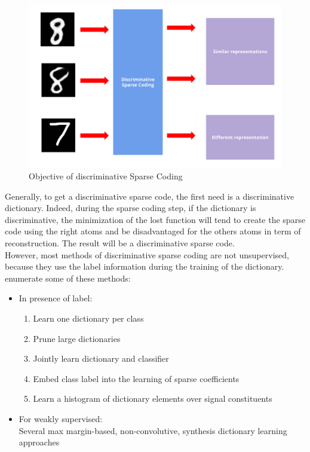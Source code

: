 
\begin{figure}[h]
 \centering
 \includegraphics[scale=0.3]{discriminative.png}
 \caption{Objective of discriminative Sparse Coding}
 \label{fig:discriminative}
\end{figure}
Generally, to get a discriminative sparse code, the first need is a discriminative dictionary. Indeed,  during the sparse coding step, if the dictionary is discriminative, the minimization of the lost function will tend to create the sparse code using the right atoms and be disadvantaged for the others atoms in term of reconstruction. The result will be a discriminative sparse code.\\
However, most methods of discriminative sparse coding are not unsupervised, because they use the label information during the training of the dictionary. \cite{8294264} enumerate some of these methods:
\begin{itemize}
 \item In presence of label:
    \begin{enumerate}
     \item Learn one dictionary per class
     \item Prune large dictionaries
     \item Jointly learn dictionary and classifier
     \item Embed class label into the learning of sparse coefficients
     \item Learn a histogram of dictionary elements over signal constituents
    \end{enumerate}

 \item For weakly supervised:\\
    Several max margin-based, non-convolutive, synthesis dictionary learning approaches
\end{itemize}
